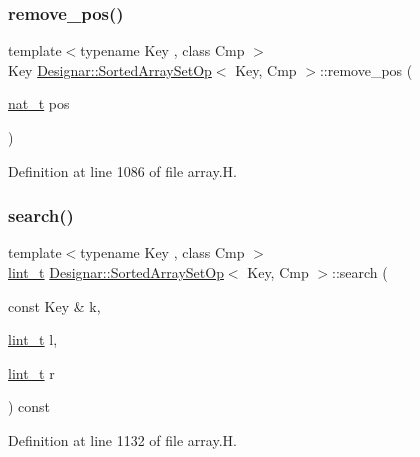 \subsubsection{\texorpdfstring{remove\+\_\+pos()}{remove\_pos()}}
{\footnotesize\ttfamily template$<$typename Key , class Cmp $>$ \\
Key \hyperlink{class_designar_1_1_sorted_array_set_op}{Designar\+::\+Sorted\+Array\+Set\+Op}$<$ Key, Cmp $>$\+::remove\+\_\+pos (\begin{DoxyParamCaption}\item[{\hyperlink{namespace_designar_aa72662848b9f4815e7bf31a7cf3e33d1}{nat\+\_\+t}}]{pos }\end{DoxyParamCaption})\hspace{0.3cm}{\ttfamily [inline]}}



Definition at line 1086 of file array.\+H.

\mbox{\label{class_designar_1_1_sorted_array_set_op_ab0dc92fe501e3349041aaafea39a6526}} 
\subsubsection{\texorpdfstring{search()}{search()}}
{\footnotesize\ttfamily template$<$typename Key , class Cmp $>$ \\
\hyperlink{namespace_designar_a9d113d66a39e82b73727c72cd3a52f73}{lint\+\_\+t} \hyperlink{class_designar_1_1_sorted_array_set_op}{Designar\+::\+Sorted\+Array\+Set\+Op}$<$ Key, Cmp $>$\+::search (\begin{DoxyParamCaption}\item[{const Key \&}]{k,  }\item[{\hyperlink{namespace_designar_a9d113d66a39e82b73727c72cd3a52f73}{lint\+\_\+t}}]{l,  }\item[{\hyperlink{namespace_designar_a9d113d66a39e82b73727c72cd3a52f73}{lint\+\_\+t}}]{r }\end{DoxyParamCaption}) const\hspace{0.3cm}{\ttfamily [protected]}}



Definition at line 1132 of file array.\+H.

\mbox{\label{class_designar_1_1_sorted_array_set_op_a4daae3c1bd56ec08a02ce5a5f231aade}} 
